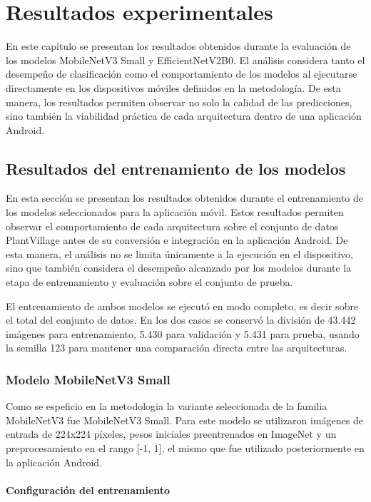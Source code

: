 \chapter{Resultados experimentales}

En este capítulo se presentan los resultados obtenidos durante la evaluación de los modelos MobileNetV3 Small y EfficientNetV2B0.
El análisis considera tanto el desempeño de clasificación como el comportamiento de los modelos al ejecutarse directamente en los
dispositivos móviles definidos en la metodología. De esta manera, los resultados permiten observar no solo la calidad de las
predicciones, sino también la viabilidad práctica de cada arquitectura dentro de una aplicación Android.

\section{Resultados del entrenamiento de los modelos}

En esta sección se presentan los resultados obtenidos durante el entrenamiento de los modelos seleccionados para la aplicación móvil.
Estos resultados permiten observar el comportamiento de cada arquitectura sobre el conjunto de datos PlantVillage antes de su
conversión e integración en la aplicación Android. De esta manera, el análisis no se limita únicamente a la ejecución en el dispositivo, sino que
también considera el desempeño alcanzado por los modelos durante la etapa de entrenamiento y evaluación sobre el conjunto de prueba.

El entrenamiento de ambos modelos se ejecutó en modo completo, es decir sobre el total del conjunto de datos. En los dos casos se conservó la división de 43.442 imágenes para
entrenamiento, 5.430 para validación y 5.431 para prueba, usando la semilla 123 para mantener una comparación directa entre las
arquitecturas.

\subsection{Modelo MobileNetV3 Small}

Como se espeficio en la metodologia la variante seleccionada de la familia MobileNetV3 fue MobileNetV3 Small. Para este modelo se utilizaron imágenes de
entrada de 224x224 píxeles, pesos iniciales preentrenados en ImageNet y un preprocesamiento en el rango [-1, 1], el mismo que fue
utilizado posteriormente en la aplicación Android.

\subsubsection{Configuración del entrenamiento}

